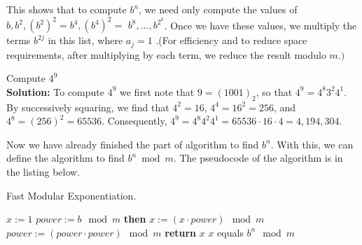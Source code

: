     This shows that to compute $b^n$, we need only compute the values of $b,b^2,(b^2)^2=b^4,(b^4)^2=$ $b^8,...,b^{2^k}$.
    Once we have these values, we multiply the terms $b^{2j}$ in this list, where $a_j=1$ .(For efficiency and to reduce space requirements, after multiplying by each term, we reduce the result modulo $m.)$
    \begin{example}
        Compute $4^9$\\
        \textbf{Solution: } To compute $4^9$ we first note that $9 = (1001)_2$, so that $4^9 = 4^8 3^2 4^1$. 
        By successively squaring, we find that $4^2 = 16$, $4^4 = 16^2 = 256$, and $4^8 = (256)^2 = 65536$. Consequently, $4^9 = 4^8 4^2 4^1 = 65536 \cdot 16 \cdot 4 = 4,194,304$. 
    \end{example}
    Now we have already finished the part of algorithm to find $b^n$. With this, we can define the algorithm to find $b^n \bmod m$.
    The pseudocode of the algorithm is in the listing below.
    \begin{algorithm} \label{modulare}
        \caption{Fast Modular Exponentiation.}
        \begin{algorithmic}
        \State $x := 1$
        \State $power := b \mod m$
         \textbf{then} $x := (x \cdot power) \mod m$
        \EndIf
        \State $power := (power \cdot power) \mod m$
        \EndFor
        \State \textbf{return} $x$ {$x$ equals $b^n \mod m$}
        \EndProcedure
        \end{algorithmic}
    \end{algorithm}

